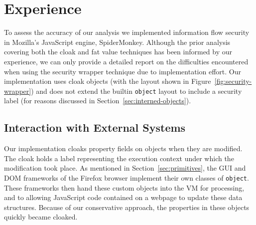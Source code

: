\documentclass[11pt,onecolumn]{article}
\begin{document}

\section{Experience}\label{sec:experience}

To assess the accuracy of our analysis we implemented information flow security in Mozilla's JavaScript engine, SpiderMonkey.
Although the prior analysis covering both the cloak and fat value techniques has been informed by our experience, we can only provide a detailed report on the difficulties encountered when using the security wrapper technique due to implementation effort.
Our implementation uses cloak objects (with the layout shown in Figure~\ref{fig:security-wrapper}) and does not extend the builtin \texttt{object} layout to include a security label (for reasons discussed in Section~\ref{sec:interned-objects}).

\subsection{Interaction with External Systems}
Our implementation cloaks property fields on objects when they are modified.
The cloak holds a label representing the execution context under which the modification took place.
As mentioned in Section~\ref{sec:primitives}, the GUI and DOM frameworks of the Firefox browser implement their own classes of \texttt{object}.
These frameworks then hand these custom objects into the VM for processing, and to allowing JavaScript code contained on a webpage to update these data structures.
Because of our conservative approach, the properties in these objects quickly became cloaked.
\end{document}

